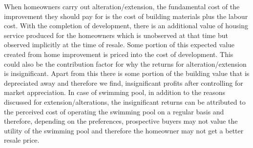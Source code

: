 \documentclass[AEJ,reqno, draftmode]{AEA} %
\begin{document}

When homeowners carry out alteration/extension, the fundamental cost of the improvement they should pay for is the cost of building materials plus the labour cost. With the completion of development, there is an additional value of housing service produced for the homeowners which is unobserved at that time but observed implicitly at the time of resale. Some portion of this expected value created from home improvement is priced into the cost of development. This could also be the contribution factor for why the returns for alteration/extension is insignificant.
Apart from this there is some portion of the building value that is depreciated away and therefore we find, insignificant profits after controlling for market appreciation. In case of swimming pool, in addition to the reasons discussed for extension/alterations, the insignificant returns can be attributed to the perceived cost of operating the swimming pool on a regular basis and therefore, depending on the preferences, prospective buyers may not value the utility of the swimming pool and therefore the homeowner may not get a better resale price.
\end{document}
